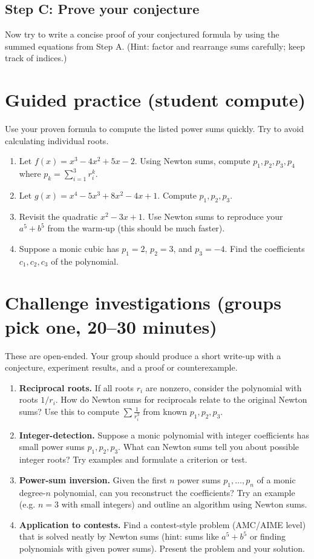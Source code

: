 \documentclass{tufte-handout}
\begin{document}
\subsection*{Step C: Prove your conjecture}
Now try to write a concise proof of your conjectured formula by using the summed equations from Step A. (Hint: factor and rearrange sums carefully; keep track of indices.)

\section*{Guided practice (student compute)}
Use your proven formula to compute the listed power sums quickly. Try to avoid calculating individual roots.

\begin{enumerate}[label=\textbf{P\arabic*.}, leftmargin=*, nosep]
  \item Let $f(x)=x^3-4x^2+5x-2$. Using Newton sums, compute $p_1,p_2,p_3,p_4$ where $p_k=\sum_{i=1}^3 r_i^k$.
  \item Let $g(x)=x^4-5x^3+8x^2-4x+1$. Compute $p_1,p_2,p_3$.
  \item Revisit the quadratic $x^2-3x+1$. Use Newton sums to reproduce your $a^5+b^5$ from the warm-up (this should be much faster).
  \item Suppose a monic cubic has $p_1=2$, $p_2=3$, and $p_3= -4$. Find the coefficients $c_1,c_2,c_3$ of the polynomial.
\end{enumerate}

\section*{Challenge investigations (groups pick one, 20--30 minutes)}
These are open-ended. Your group should produce a short write-up with a conjecture, experiment results, and a proof or counterexample.

\begin{enumerate}[label=\textbf{C\arabic*.}, leftmargin=*, nosep]
  \item \textbf{Reciprocal roots.} If all roots $r_i$ are nonzero, consider the polynomial with roots $1/r_i$. How do Newton sums for reciprocals relate to the original Newton sums? Use this to compute $\sum \frac{1}{r_i^3}$ from known $p_1,p_2,p_3$.
  \item \textbf{Integer-detection.} Suppose a monic polynomial with integer coefficients has small power sums $p_1,p_2,p_3$. What can Newton sums tell you about possible integer roots? Try examples and formulate a criterion or test.
  \item \textbf{Power-sum inversion.} Given the first $n$ power sums $p_1,\dots,p_n$ of a monic degree-$n$ polynomial, can you reconstruct the coefficients? Try an example (e.g. $n=3$ with small integers) and outline an algorithm using Newton sums.
  \item \textbf{Application to contests.} Find a contest-style problem (AMC/AIME level) that is solved neatly by Newton sums (hint: sums like $a^5+b^5$ or finding polynomials with given power sums). Present the problem and your solution.
\end{enumerate}
\end{document}
